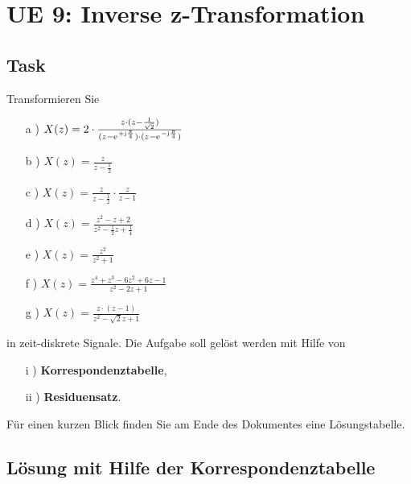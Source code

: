\clearpage
\section{UE 9: Inverse z-Transformation}

\subsection{Task}
Transformieren Sie
\begin{itemize}
	\item[a )] $X(z)=2\cdot\frac{z\cdot(z-\frac{1}{\sqrt{2}})}{(z-\e^{+\im\frac{\pi}{4}})\cdot(z-\e^{-\im\frac{\pi}{4}})}$
	\item[b )] $X(z)=\frac{z}{z-\frac{1}{2}}$
	\item[c )] $X(z)=\frac{z}{z-\frac{1}{2}}\cdot\frac{z}{z-1}$
	\item[d )] $X(z)=\frac{z^2-z+2}{z^2-\frac{1}{2}z+\frac{1}{4}}$
	\item[e )] $X(z)=\frac{z^2}{z^2+1}$
	\item[f )] $X(z)=\frac{z^4+z^3-6z^2+6z-1}{z^2-2z+1}$
	\item[g )] $X(z)=\frac{z\cdot(z-1)}{z^2-\sqrt{2}z+1}$
\end{itemize}
in zeit-diskrete Signale.
Die Aufgabe soll gelöst werden mit Hilfe von
\begin{itemize}
	\item[i )] \textbf{Korrespondenztabelle},
	\item[ii )] \textbf{Residuensatz}.
\end{itemize}
Für einen kurzen Blick finden Sie am Ende des Dokumentes eine Lösungstabelle.
\subsection{Lösung mit Hilfe der Korrespondenztabelle}

